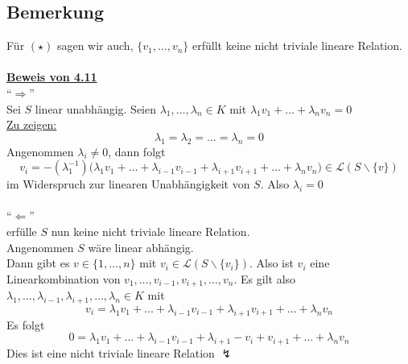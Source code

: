 \subsection{Bemerkung} %
\label{sub:bemerkung}
Für $(\star)$ sagen wir auch, $\{v_1, \ldots , v_n\}$ erfüllt keine nicht triviale lineare Relation. \\
\vspace{\baselineskip} \\
\underline{\textbf{Beweis von 4.11}}
\vspace{\baselineskip} \\
\enquote{$\Longrightarrow$} \\
Sei $S$ linear unabhängig. Seien $\lambda_1, \ldots , \lambda_n \in K$ mit $\lambda_1 v_1 + \ldots + \lambda_n v_n = 0$ \\
\underline{Zu zeigen:}
\[
	\lambda_1 = \lambda_2 = \ldots = \lambda_n = 0
\]
Angenommen $\lambda_i \not= 0$, dann folgt
\[
	v_i = - (\lambda_1^{-1}) \big(\lambda_1 v_1+ \ldots + \lambda_{i-1} v_{i-1} + \lambda_{i+1} v_{i+1} + \ldots + \lambda_n v_n \big)
	\in \mathcal{L} (S \backslash \{v\})
\]
im Widerspruch zur linearen Unabhängigkeit von $S$. Also $\lambda_i = 0$ \\
\vspace{\baselineskip} \\
\enquote{$\Longleftarrow$} \\
erfülle $S$ nun keine nicht triviale lineare Relation. \\
Angenommen $S$ wäre linear abhängig. 
\vspace{\baselineskip} \\
Dann gibt es $v  \in \{1, \ldots , n\}$ mit $v_i \in \mathcal{L}(S \backslash \{v_i\})$. Also ist $v_i$ eine Linearkombination von $v_1, \ldots , v_{i-1}, v_{i+1}, \ldots , v_n$. Es gilt also
$\lambda_1, \ldots , \lambda_{i-1}, \lambda_{i+1}, \ldots , \lambda_n \in K$ mit 
\[
	v_i = \lambda_1 v_1 + \ldots + \lambda_{i-1} v_{i-1} + \lambda_{i+1} v_{i+1} + \ldots + \lambda_n v_n
\]
Es folgt \[
	0= \lambda_1 v_1 + \ldots + \lambda_{i-1} v_{i-1} + \lambda_{i+1} - v_i +v_{i+1} + \ldots + \lambda_n v_n
\]
Dies ist eine nicht triviale lineare Relation {\huge $\lightning$}

